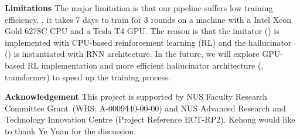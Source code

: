 \documentclass[10pt,twocolumn,letterpaper]{article}
\begin{document}
\noindent \textbf{Limitations} 
The major limitation is that our pipeline suffers low training efficiency, \eg, it takes 7 days to train for 3 rounds on a machine with a Intel Xeon Gold 6278C CPU and a Tesla T4 GPU. The reason is that the imitator () is implemented with CPU-based reinforcement learning (RL) and the hallucinator () is instantiated with RNN architecture. In the future, we will explore GPU-based RL implementation and more efficient hallucinator architecture (\eg, transformer) to speed up the training process.







\noindent \textbf{Acknowledgement} 
This project is supported by
NUS Faculty Research Committee Grant~(WBS: A-0009440-00-00)
and NUS Advanced Research and Technology Innovation Centre (Project Reference ECT-RP2).
Kehong would like to thank Ye Yuan for the discussion. 

{\small


}
\end{document}
